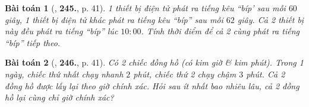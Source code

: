 \documentclass{article}
\numberwithin{equation}{section}
\newtheorem{baitoan}{Bài toán}[section]
\begin{document}
\begin{baitoan}[\cite{Binh_Toan_6_tap_1}, \textbf{245.}, p. 41]
	1 thiết bị điện tử phát ra tiếng kêu ``bíp' sau mỗi $60$ giây, 1 thiết bị điện tử khác phát ra tiếng kêu ``bíp'' sau mỗi $62$ giây. Cả 2 thiết bị này đều phát ra tiếng ``bíp'' lúc $10:00$. Tính thời điểm để cả 2 cùng phát ra tiếng ``bíp'' tiếp theo.
\end{baitoan}

\begin{baitoan}[\cite{Binh_Toan_6_tap_1}, \textbf{246.}, p. 41]
	Có 2 chiếc đồng hồ (có kim giờ \& kim phút). Trong 1 ngày, chiếc thứ nhất chạy nhanh $2$ phút, chiếc thứ 2 chạy chậm $3$ phút. Cả 2 đồng hồ được lấy lại theo giờ chính xác. Hỏi sau ít nhất bao nhiêu lâu, cả 2 đồng hồ lại cùng chỉ giờ chính xác?
\end{baitoan}


\printbibliography[heading=bibintoc]
	
\end{document}
